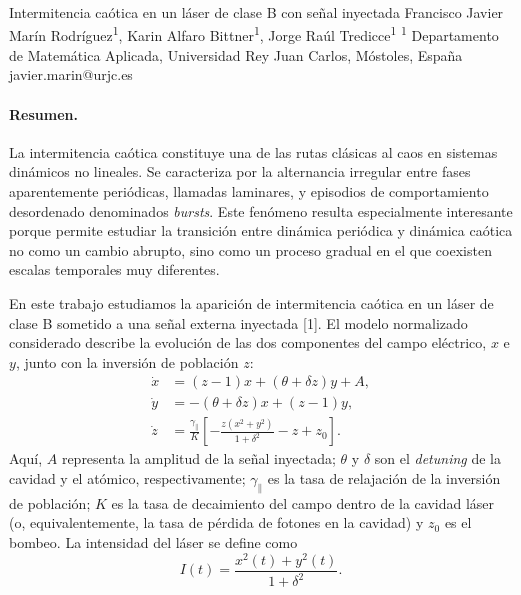 \documentclass[11pt,a4paper]{article}
\begin{document}

\begin{sincabstract}
{Intermitencia caótica en un láser de clase B con señal inyectada}
{Francisco Javier Marín Rodríguez\textsuperscript{1}, Karin Alfaro Bittner\textsuperscript{1}, Jorge Raúl Tredicce\textsuperscript{1}}
{\textsuperscript{1} Departamento de Matemática Aplicada, Universidad Rey Juan Carlos, Móstoles, España}
{javier.marin@urjc.es}

\paragraph{Resumen.}
La intermitencia caótica constituye una de las rutas clásicas al caos en sistemas dinámicos no lineales. Se caracteriza por la alternancia irregular entre fases aparentemente periódicas, llamadas laminares, y episodios de comportamiento desordenado denominados \textit{bursts}. Este fenómeno resulta especialmente interesante porque permite estudiar la transición entre dinámica periódica y dinámica caótica no como un cambio abrupto, sino como un proceso gradual en el que coexisten escalas temporales muy diferentes.

En este trabajo estudiamos la aparición de intermitencia caótica en un láser de clase B sometido a una señal externa inyectada [1]. El modelo normalizado considerado describe la evolución de las dos componentes del campo eléctrico, $x$ e $y$, junto con la inversión de población $z$:
\begin{align*}
\dot{x} &= (z-1)x+(\theta+\delta z)y+A,\\
\dot{y} &= -(\theta+\delta z)x+(z-1)y,\\
\dot{z} &= \frac{\gamma_{\parallel}}{K}\left[-\frac{z(x^2+y^2)}{1+\delta^2}-z+z_0\right].
\end{align*}
Aquí, $A$ representa la amplitud de la señal inyectada; $\theta$ y $\delta$ son el \textit{detuning} de la cavidad y el atómico, respectivamente; $\gamma_{\parallel}$ es la tasa de relajación de la inversión de población; $K$ es la tasa de decaimiento del campo dentro de la cavidad láser (o, equivalentemente, la tasa de pérdida de fotones en la cavidad) y $z_0$ es el bombeo. La intensidad del láser se define como
\begin{equation*}
I(t)=\frac{x^2(t)+y^2(t)}{1+\delta^2}.
\end{equation*}


\end{sincabstract}
\end{document}
